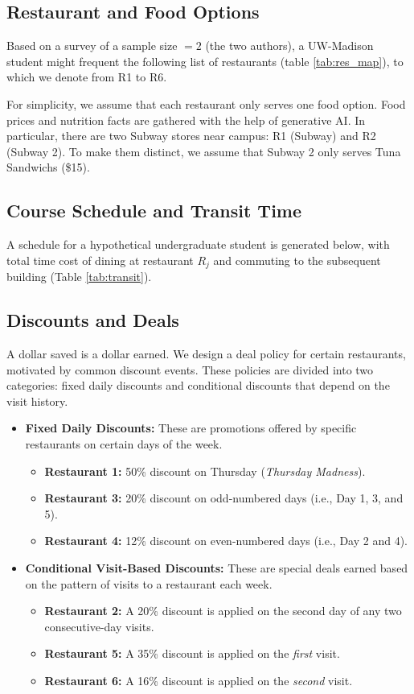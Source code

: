 \documentclass{article}
\begin{document}
\subsection{Restaurant and Food Options}
Based on a survey of a sample size $=2$ (the two authors), a UW-Madison student might frequent the following list of restaurants (table 
\ref{tab:res_map}), to which we denote from R1 to R6.

For simplicity, we assume that each restaurant only serves one food option. Food prices and nutrition facts are gathered with the help of generative AI. In particular, there are two Subway stores near campus: R1 (Subway) and R2 (Subway 2). To make them distinct, we assume that Subway 2 only serves Tuna Sandwichs (\$15).

\subsection{Course Schedule and Transit Time}
A schedule for a hypothetical undergraduate student is generated below, with total time cost of dining at restaurant $R_j$ and commuting to the subsequent building (Table \ref{tab:transit}). 



\subsection{Discounts and Deals}
\label{sec:deals}
A dollar saved is a dollar earned. We design a deal policy for certain restaurants, motivated by common discount events. These policies are divided into two categories: fixed daily discounts and conditional discounts that depend on the visit history.

\begin{itemize}
\item \textbf{Fixed Daily Discounts:} These are promotions offered by specific restaurants on certain days of the week.
\begin{itemize}
\item \textbf{Restaurant 1:} 50\% discount on Thursday (\textit{Thursday Madness}).
\item \textbf{Restaurant 3:} 20\% discount on odd-numbered days (i.e., Day 1, 3, and 5).
\item \textbf{Restaurant 4:} 12\% discount on even-numbered days (i.e., Day 2 and 4).
\end{itemize}
\item \textbf{Conditional Visit-Based Discounts:} These are special deals earned based on the pattern of visits to a restaurant each week.
\begin{itemize}
\item \textbf{Restaurant 2:} A 20\% discount is applied on the second day of any two consecutive-day visits.
\item \textbf{Restaurant 5:} A 35\% discount is applied on the \textit{first} visit.
\item \textbf{Restaurant 6:} A 16\% discount is applied on the \textit{second} visit.
\end{itemize}
\end{itemize}
\end{document}
